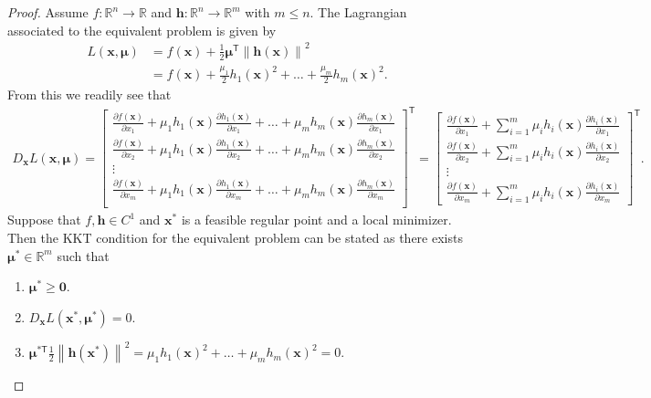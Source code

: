 \documentclass[12pt]{article}
\theoremstyle{definition}
\newcommand{\vc}[1]{\boldsymbol{#1}}
\newcommand{\norm}[1]{\left\lVert#1\right\rVert}
\newcommand{\tran}{\mathsf{T}}
\begin{document}
\begin{proof}
  Assume $f:\mathbb{R}^n\to\mathbb{R}$ and $\vc{h}:\mathbb{R}^n \to \mathbb{R}^m$ with $m \leq n$.
  The Lagrangian associated to the equivalent problem is given by
  \begin{align*}
    L(\vc{x}, \vc{\mu}) &= f(\vc{x}) + \frac{1}{2}\vc{\mu}^\tran\norm{\vc{h}(\vc{x})}^2 \\
    &= f(\vc{x})+ \frac{\mu_1}{2}h_1(\vc{x})^2 + \dots + \frac{\mu_m}{2}h_m(\vc{x})^2.
  \end{align*}
  From this we readily see that
  \begin{align*}
    D_{\vc{x}}L(\vc{x},\vc{\mu}) =
    \begin{bmatrix}
      \frac{\partial f(\vc{x})}{\partial x_1} + \mu_1 h_1(\vc{x}) \frac{\partial h_1(\vc{x})}{\partial x_1} + \dots + \mu_m h_m(\vc{x}) \frac{\partial h_m(\vc{x})}{\partial x_1}\\
      \frac{\partial f(\vc{x})}{\partial x_2} + \mu_1 h_1(\vc{x}) \frac{\partial h_1(\vc{x})}{\partial x_2} + \dots + \mu_m h_m(\vc{x}) \frac{\partial h_m(\vc{x})}{\partial x_2}\\
      \vdots \\
      \frac{\partial f(\vc{x})}{\partial x_m} + \mu_1 h_1(\vc{x}) \frac{\partial h_1(\vc{x})}{\partial x_m} + \dots + \mu_m h_m(\vc{x}) \frac{\partial h_m(\vc{x})}{\partial x_m}\\
    \end{bmatrix}^\tran
    =
    \begin{bmatrix}
      \frac{\partial f(\vc{x})}{\partial x_1} + \sum_{i=1}^m \mu_i h_i(\vc{x}) \frac{\partial h_i(\vc{x})}{\partial x_1}\\
      \frac{\partial f(\vc{x})}{\partial x_2} + \sum_{i=1}^m \mu_i h_i(\vc{x}) \frac{\partial h_i(\vc{x})}{\partial x_2}\\
      \vdots\\
      \frac{\partial f(\vc{x})}{\partial x_m} + \sum_{i=1}^m \mu_i h_i(\vc{x}) \frac{\partial h_i(\vc{x})}{\partial x_m}
    \end{bmatrix}^\tran.
  \end{align*}
  Suppose that $f, \vc{h} \in C^1$ and $\vc{x}^*$ is a feasible regular point and a local minimizer.
  Then the KKT condition for the equivalent problem can be stated as
  there exists $\vc{\mu}^{*} \in \mathbb{R}^m$ such that
  \begin{enumerate}[label=\roman*.]
    \item $\vc{\mu}^* \geq \vc{0}$.
    \item $D_{\vc{x}}L(\vc{x}^*,\vc{\mu}^*) = 0$.
    \item $\vc{\mu}^{*\tran}\frac{1}{2}\norm{\vc{h}(\vc{x}^*)}^2 = \mu_1 h_1(\vc{x})^2 + \dots + \mu_m h_m(\vc{x})^2 =0.$
  \end{enumerate}


\end{proof}
\end{document}
